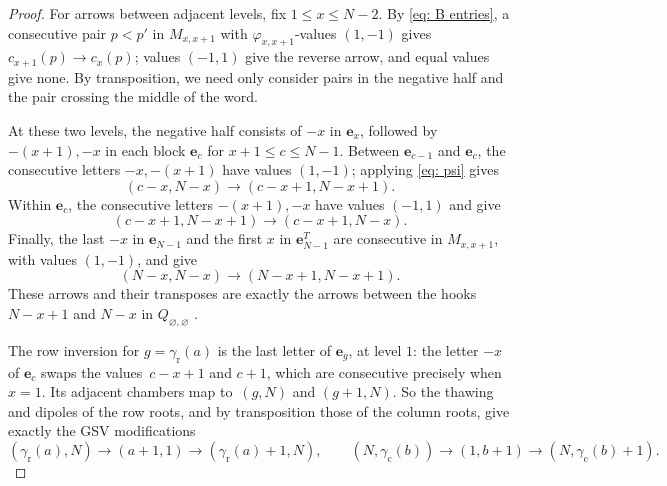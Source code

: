 \documentclass[a4paper]{amsart}
\numberwithin{equation}{section}
\theoremstyle{definition}
\theoremstyle{remark}
\newcommand{\rr}{\mathrm{r}}
\newcommand{\cc}{\mathrm{c}}
\begin{document}
\begin{proof}
  For arrows between adjacent levels, fix $1\le x\le N-2$.
  By \eqref{eq: B entries}, a consecutive pair $p<p'$ in $M_{x,x+1}$ with $\varphi_{x,x+1}$-values $(1,-1)$ gives $c_{x+1}(p)\to c_x(p)$; values $(-1,1)$ give the reverse arrow, and equal values give none.
  By transposition, we need only consider pairs in the negative half and the pair crossing the middle of the word.

  At these two levels, the negative half consists of $-x$ in $\mathbf e_x$, followed by $-(x+1),-x$ in each block $\mathbf e_c$ for $x+1\le c\le N-1$.
  Between $\mathbf e_{c-1}$ and $\mathbf e_c$, the consecutive letters $-x,-(x+1)$ have values $(1,-1)$; applying \eqref{eq: psi} gives
  \[
    (c-x,N-x)\longrightarrow(c-x+1,N-x+1).
  \]
  Within $\mathbf e_c$, the consecutive letters $-(x+1),-x$ have values $(-1,1)$ and give
  \[
    (c-x+1,N-x+1)\longrightarrow(c-x+1,N-x).
  \]
  Finally, the last $-x$ in $\mathbf e_{N-1}$ and the first $x$ in $\mathbf e_{N-1}^T$ are consecutive in $M_{x,x+1}$, with values $(1,-1)$, and give
  \[
    (N-x,N-x)\longrightarrow(N-x+1,N-x+1).
  \]
  These arrows and their transposes are exactly the arrows between the hooks $N-x+1$ and $N-x$ in $Q_{\varnothing,\varnothing}$ \cite[Section~4.3 and Figure~5]{GSV23}.

  The row inversion for $g=\gamma_{\rr}(a)$ is the last letter of $\mathbf e_g$, at level $1$: the letter $-x$ of $\mathbf e_c$ swaps the values~$c-x+1$ and $c+1$, which are consecutive precisely when $x=1$.
  Its adjacent chambers map to~$(g,N)$ and $(g+1,N)$.
  So the thawing and dipoles of the row roots, and by transposition those of the column roots, give exactly the GSV modifications
  \begin{equation}
    \label{eq: GSV arrows}
    (\gamma_{\rr}(a),N)\to(a+1,1)\to(\gamma_{\rr}(a)+1,N),\qquad
    (N,\gamma_{\cc}(b))\to(1,b+1)\to(N,\gamma_{\cc}(b)+1).
  \end{equation}


\end{proof}
\end{document}
